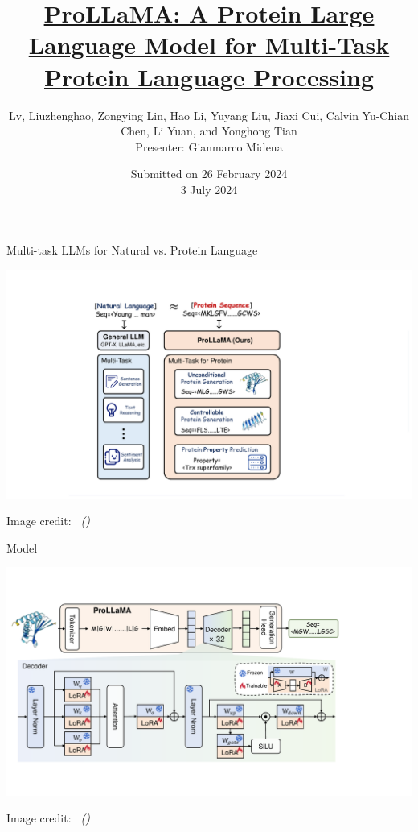 \documentclass[dvipsnames,
hyperref={citecolor=black}
]{beamer}
\title[ProLLaMA]
{\href{https://doi.org/10.48550/arXiv.2402.16445}{ProLLaMA: A Protein Large Language Model for Multi-Task Protein Language Processing}}
\author[Liuzhenghao Lv et al.]{Lv, Liuzhenghao, Zongying Lin, Hao Li, Yuyang Liu, Jiaxi Cui, Calvin Yu-Chian Chen, Li Yuan, and Yonghong Tian
\\\vspace{2em}Presenter: Gianmarco Midena}
\date[3 July 2024]{Submitted on 26 February 2024 
\\\vspace{2em}3 July 2024}
\newcommand{\credit}[2]{{\par\hfill \tiny #1 credit:~\itshape\citeauthor{#2} (\citeyear{#2})}}
\begin{document}
\begin{frame}
\titlepage
\end{frame}


\begin{frame}{Multi-task LLMs for Natural vs. Protein Language}
	\begin{center}
		\includegraphics[scale=0.5]{images/multitask_LLMs_NLP_vs_PLP.pdf}
	\end{center}
	\credit{Image}{lv2024prollama}
\end{frame}

\begin{frame}{Model}
	\begin{center}
		\includegraphics[scale=0.44]{images/model.pdf}
	\end{center}
	\credit{Image}{lv2024prollama}
\end{frame}
\end{document}
